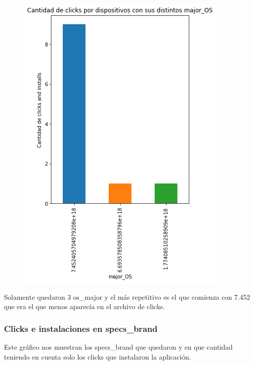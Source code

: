 \documentclass[a4paper, 12pt]{article}
\begin{document}
{{	
		\begin{figure}[H]
			\centering
			\includegraphics[scale = 0.5]{images/clicks-installs/major_os.png}
			\caption{}
		\end{figure}
	

	Solamente quedaron 3 os\_major y el más repetitivo es el que comienza con 7.452 que era el que menos aparecía en el archivo de clicks.
	
	\subsubsection{Clicks e instalaciones en specs\_brand}
	Este gráfico nos muestran los specs\_brand que quedaron y en que cantidad teniendo en cuenta solo los clicks que instalaron la aplicación.
	
}}
\end{document}
